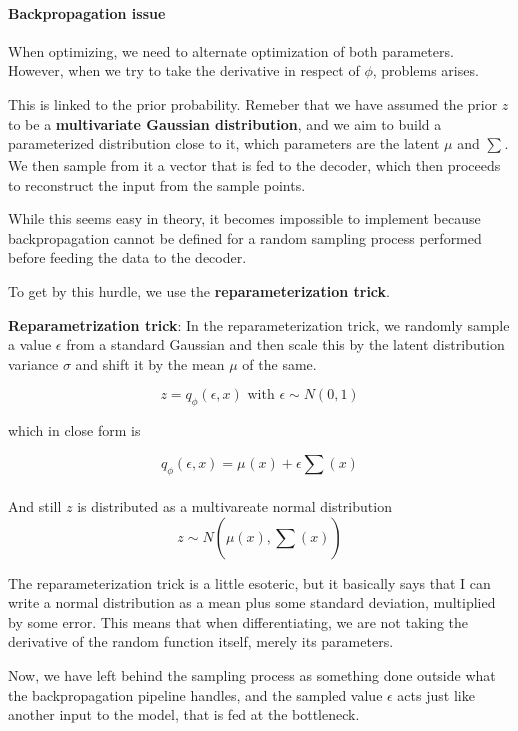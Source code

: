 \paragraph{Backpropagation issue}

When optimizing, we need to alternate optimization of both parameters. However, when we try to take the derivative in respect of $\phi$, problems arises.



This is linked to the prior probability. Remeber that we have assumed the prior $z$ to be a \textbf{multivariate Gaussian distribution}, and we aim to build a parameterized distribution close to it, which parameters are the latent $\mu$ and $\sum_{}$. We then sample from it a vector that is fed to the decoder, which then proceeds to reconstruct the input from the sample points.

While this seems easy in theory, it becomes impossible to implement because backpropagation cannot be defined for a random sampling process performed before feeding the data to the decoder.

To get by this hurdle, we use the \textbf{reparameterization trick}.

\textbf{Reparametrization trick}: In the reparameterization trick, we randomly sample a value $\epsilon$ from a standard Gaussian and then scale this by the latent distribution variance $\sigma$ and shift it by the mean $\mu$ of the same.

$$z = q_{\phi}(\epsilon, x) \text{ with } \epsilon \sim N(0,1)$$


which in close form is 

$$q_{\phi}(\epsilon, x) = \mu_{}(x) + \epsilon \sum_{} (x)$$

And still $z$ is distributed as a multivareate normal distribution $$z \sim N(\mu(x), \sum_{} (x))$$ 


The reparameterization trick is a little esoteric, but it basically says that I can write a normal distribution as a mean plus some standard deviation, multiplied by some error. This means that when differentiating, we are not taking the derivative of the random function itself, merely its parameters.

Now, we have left behind the sampling process as something done outside what the backpropagation pipeline handles, and the sampled value $\epsilon$ acts just like another input to the model, that is fed at the bottleneck.




